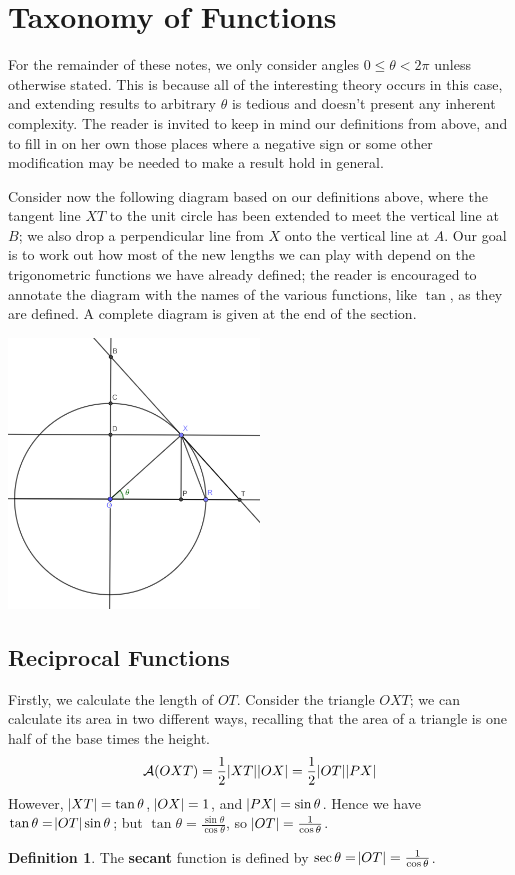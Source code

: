 \documentclass[a4paper,leqno]{article}
\newcommand{\marginsymbol}{\marginpar{\hfill(\ding{43})}}
\numberwithin{equation}{section}
\theoremstyle{definition}
\newtheorem{defn}[equation]{Definition}
\theoremstyle{remark}
\newcommand{\df}[1]{\textbf{#1}}
\begin{document}
\section{Taxonomy of Functions}
For the remainder of these notes, we only consider angles $ 0 \leq \theta < 2\pi $ unless otherwise stated. This is because
all of the interesting theory occurs in this case, and extending results to arbitrary $ \theta $ is tedious and doesn't present
any inherent complexity. The reader is invited to keep in mind our definitions from above, and to fill in on her own those
places where a negative sign or some other modification may be needed to make a result hold in general.

Consider now the following diagram based on our definitions above, where the tangent line $ XT $ to the unit circle has been
extended to meet the vertical line at $ B $; we also drop a perpendicular line from $ X $ onto the vertical line at $ A $.
Our goal is to work out how most of the new lengths we can play with depend on the trigonometric functions we have already
defined; the reader is encouraged to annotate the diagram with the names of the various functions, like $ \tan $, as they
are defined. A complete diagram is given at the end of the section.
\begin{center}
  \includegraphics[width=0.5\textwidth]{taxonomy}
\end{center}

\subsection{Reciprocal Functions}
Firstly, we calculate the length of $ OT $. Consider the triangle $ OXT $; we can calculate its area in two different ways,
recalling that the area of a triangle is one half of the base times the height.
\begin{displaymath}
  \mathcal{A}(OXT) = \frac{1}{2}\abs{XT}\abs{OX} = \frac{1}{2}\abs{OT}\abs{PX}
\end{displaymath}
However, $ \abs{XT} = \tan \theta $, $ \abs{OX} = 1 $, and $ \abs{PX} = \sin \theta $. Hence we
have $ \tan \theta = \abs{OT}\sin \theta $; but $ \tan \theta = \frac{\sin \theta}{\cos \theta} $,
so $ \abs{OT} = \frac{1}{\cos \theta} $.
\begin{defn}
  The \df{secant} function is defined by $ \sec \theta = \abs{OT} = \frac{1}{\cos \theta} $. \marginsymbol
\end{defn}
\end{document}
